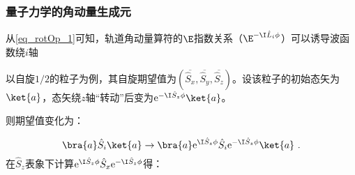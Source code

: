 \subsubsection{量子力学的角动量生成元}
从\autoref{eq_rotOp_1}可知，轨道角动量算符的$\E$指数关系（$\E^{-\I \hat L_i\phi}$）可以诱导波函数绕$i$轴


以自旋$1/2$的粒子为例，其自旋期望值为$(\overline{\hat S_x},\overline{\hat S_y},\overline{\hat S_z})$。设该粒子的初始态矢为$\ket{a}$，态矢绕$z$轴“转动”后变为$\mathrm e^{- \I\hat S_z\phi}\ket{a}$。

则期望值变化为：

\begin{equation}
\bra{a}\hat S_i\ket{a}\rightarrow \bra{a}\mathrm e^{ \I\hat S_z\phi}\hat S_i\mathrm e^{- \I\hat S_z\phi}\ket{a}~.
\end{equation}
在$\hat S_z$表象下计算$\mathrm e^{ \I\hat S_z\phi}\hat S_x\mathrm e^{- \I\hat S_z\phi}$得：

